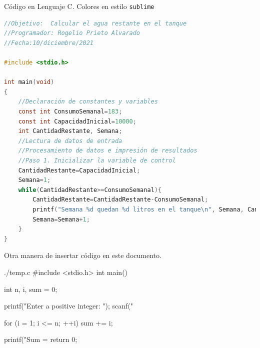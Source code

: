 \documentclass[spanish,11pt,twoside]{article}
\begin{document}
\vspace{20pt}
Código en Lenguaje C. Colores en estilo \texttt{sublime}
\begin{mdframed}[backgroundcolor=clr-background,topline=true,bottomline=true,leftline=false,rightline=false,innerleftmargin=\leftskip, innertopmargin=0pt]

	\begin{lstlisting}[language=C]
//Objetivo:  Calcular el agua restante en el tanque 
//Programador: Rogelio Prieto Alvarado
//Fecha:10/diciembre/2021

#include <stdio.h>

int main(void)
{
	//Declaración de constantes y variables
	const int ConsumoSemanal=183;
	const int CapacidadInicial=10000;
	int CantidadRestante, Semana;
	//Lectura de datos de entrada
	//Procesamiento de datos e impresión de resultados
	//Paso 1. Inicializar la variable de control
	CantidadRestante=CapacidadInicial;
	Semana=1;
	while(CantidadRestante>=ConsumoSemanal){
		CantidadRestante=CantidadRestante-ConsumoSemanal;
		printf("Semana %d quedan %d litros en el tanque\n", Semana, CantidadRestante);
		Semana=Semana+1;
	}
} \end{lstlisting}
\end{mdframed}




\newpage
Otra manera de insertar código en este documento.

\begin{verbatimwrite}{./temp.c}
	#include <stdio.h>
	int main() {
		int n, i, sum = 0;
		
		printf("Enter a positive integer: ");
		scanf("%
		
		for (i = 1; i <= n; ++i) {
			sum += i;
		}
		
		printf("Sum = %
		return 0;
	}
\end{verbatimwrite}
\begin{mdframed}[backgroundcolor=clr-background,topline=true,bottomline=true,leftline=false,rightline=false,innerleftmargin=\leftskip, innertopmargin=0pt]
	
\end{mdframed}


\end{document}
